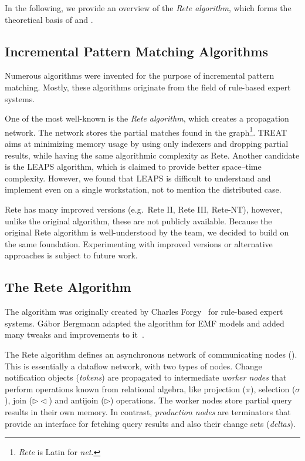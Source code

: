 In the following, we provide an overview of the \emph{Rete algorithm}, which forms the theoretical basis of \eiq{} and \iqd{}.

\subsection{Incremental Pattern Matching Algorithms}

Numerous algorithms were invented for the purpose of incremental pattern matching. Mostly, these algorithms originate from the field of rule-based expert systems.

One of the most well-known is the \emph{Rete algorithm}, which creates a propagation network. The network stores the partial matches found in the graph\footnote{\emph{Rete} is Latin for \emph{net}.}. TREAT \cite{Miranker:1991:OPT:627280.627434} aims at minimizing memory usage by using only indexers and dropping partial results, while having the same algorithmic complexity as Rete. Another candidate is the LEAPS \cite{Batory:1994:LA:899216} algorithm, which is claimed to provide better space--time complexity. However, we found that LEAPS is difficult to understand and implement even on a single workstation, not to mention the distributed case. 

Rete has many improved versions (e.g.\ Rete II, Rete III, Rete-NT), however, unlike the original algorithm, these are not publicly available. Because the original Rete algorithm is well-understood by the \eiq{} team, we decided to build \iqd{} on the same foundation. Experimenting with improved versions or alternative approaches is subject to future work.

\subsection{The Rete Algorithm}
\label{rete}

The algorithm was originally created by Charles Forgy~\cite{Forgy} for rule-based expert systems. Gábor Bergmann  adapted the algorithm for EMF models and added many tweaks and improvements to it~\cite{BergmannMasters}.


The Rete algorithm defines an asynchronous network of communicating nodes (). This is essentially a dataflow network, with two types of nodes. Change notification objects (\emph{tokens}) are propagated to intermediate \emph{worker nodes} that perform operations known from relational algebra, like projection ($ \pi $), selection ($ \sigma $),  join ($ \rhd\!\!\lhd $) and antijoin ($ \rhd $) operations. The worker nodes store partial query results in their own memory. In contrast, \emph{production nodes} are terminators that provide an interface for fetching query results and also their change sets (\emph{deltas}).

